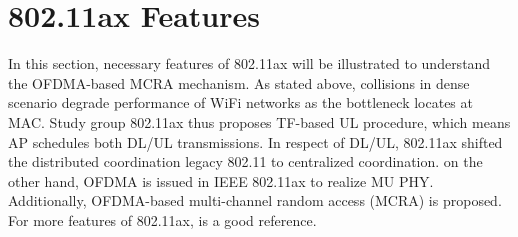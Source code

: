 \documentclass[journal]{IEEEtran}
\begin{document}
%
%


\section{802.11ax Features}			\label{sec_ax_feature}
In this section, necessary features of 802.11ax will be illustrated to understand the OFDMA-based MCRA mechanism.
As stated above, collisions in dense scenario degrade performance of WiFi networks as the bottleneck locates at MAC.
Study group 802.11ax thus proposes TF-based UL procedure, which means AP schedules both DL/UL transmissions.
In respect of DL/UL, 802.11ax shifted the distributed coordination legacy 802.11 to centralized coordination.
on the other hand, OFDMA is issued in IEEE 802.11ax to realize MU PHY.
Additionally, OFDMA-based multi-channel random access (MCRA) is proposed.
For more features of 802.11ax, \cite{dengquality} is a good reference.
\end{document}
